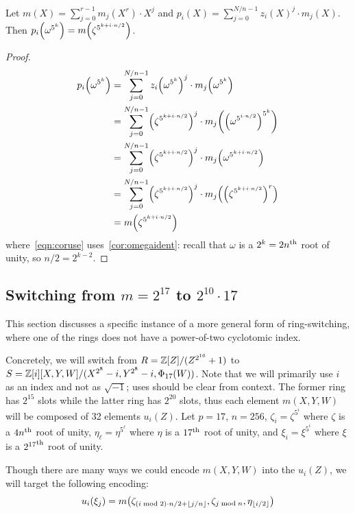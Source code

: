 \documentclass[../fheimpl.tex]{subfiles}
\begin{document}
	\begin{theorem}
		Let $m(X) = \sum_{j=0}^{r-1} m_j(X^r)\cdot X^j$ and $p_i(X) = \sum_{j=0}^{N/n-1} z_i(X)^j\cdot m_j(X)$. Then $p_i\parens*{\omega^{5^k}} = m\parens*{\zeta^{5^{k+i\cdot n/2}}}$.
	\end{theorem}
	\begin{proof}
		\begin{align}
			p_i\parens*{\omega^{5^k}} &= \sum_{j=0}^{N/n-1} z_i\parens*{\omega^{5^k}}^j\cdot m_j\parens*{\omega^{5^k}} \\
			&= \sum_{j=0}^{N/n-1} \parens*{\zeta^{5^{k+i\cdot n/2}}}^j\cdot m_j\parens*{\parens*{\omega^{5^{i\cdot n/2}}}^{5^k}} \label{eqn:coruse}\\
			&= \sum_{j=0}^{N/n-1} \parens*{\zeta^{5^{k+i\cdot n/2}}}^j\cdot m_j\parens*{\omega^{5^{k+i\cdot n/2}}} \\
			&= \sum_{j=0}^{N/n-1} \parens*{\zeta^{5^{k+i\cdot n/2}}}^j\cdot m_j\parens*{\parens*{\zeta^{5^{k+i\cdot n/2}}}^r} \\
			&= m\parens*{\zeta^{5^{k+i\cdot n/2}}}
		\end{align}
		where~\cref{eqn:coruse} uses~\cref{cor:omegaident}: recall that $\omega$ is a $2^k=2n^{\mathrm{th}}$ root of unity, so $n/2 = 2^{k-2}$.
	\end{proof}
	
	\subsection{Switching from $m=2^{17}$ to $2^{10}\cdot 17$}
	This section discusses a specific instance of a more general form of ring-switching, where one of the rings does not have a power-of-two cyclotomic index.
	
	Concretely, we will switch from $R=\mathbb{Z}[Z]/(Z^{2^{16}}+1)$ to $S=\mathbb{Z}[i][X,Y,W]/(X^{2^8}-i, Y^{2^8}-i, \Phi_{17}(W))$. Note that we will primarily use $i$ as an index and not as $\sqrt{-1}$; uses should be clear from context. The former ring has $2^{15}$ slots while the latter ring has $2^{20}$ slots, thus each element $m(X,Y,W)$ will be composed of 32 elements $u_i(Z)$. Let $p=17$, $n=256$, $\zeta_i = \zeta^{5^i}$ where $\zeta$ is a $4n^{\mathrm{th}}$ root of unity, $\eta_\ell=\eta^{5^\ell}$ where $\eta$ is a $17^{\mathrm{th}}$ root of unity, and $\xi_i=\xi^{5^i}$ where $\xi$ is a ${2^{17}}^{\mathrm{th}}$ root of unity.
	
	
	Though there are many ways we could encode $m(X,Y,W)$ into the $u_i(Z)$, we will target the following encoding:
	\[u_i\parens*{\xi_j} = m\parens*{\zeta_{(i\bmod 2)\cdot n/2+\floor{j/n}}, \zeta_{j\bmod n}, \eta_{\floor{i/2}}}\]
	
\end{document}
